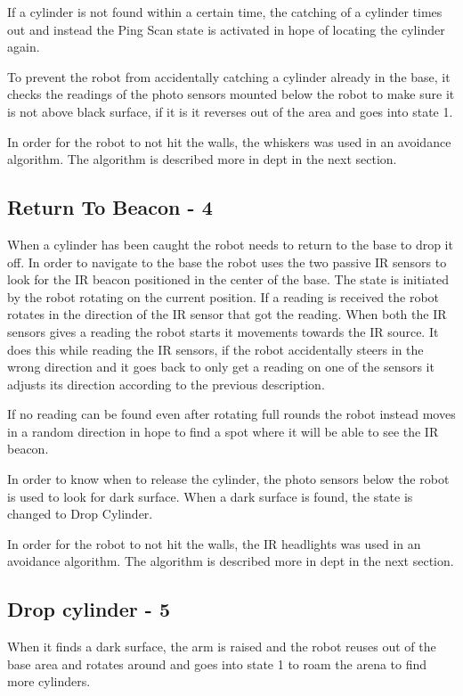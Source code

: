 If a cylinder is not found within a certain time, the catching of a cylinder times out and instead the Ping Scan state is activated in hope of locating the cylinder again.

To prevent the robot from accidentally catching a cylinder already in the base, it checks the readings of the photo sensors mounted below the robot to make sure it is not above black surface, if it is it reverses out of the area and goes into state 1.

In order for the robot to not hit the walls, the whiskers was used in an avoidance algorithm. The algorithm is described more in dept in the next section.

\subsection{Return To Beacon - 4}
When a cylinder has been caught the robot needs to return to the base to drop it off. In order to navigate to the base the robot uses the two passive IR sensors to look for the IR beacon positioned in the center of the base. The state is initiated by the robot rotating on the current position. If a reading is received the robot rotates in the direction of the IR sensor that got the reading. When both the IR sensors gives a reading the robot starts it movements towards the IR source. It does this while reading the IR sensors, if the robot accidentally steers in the wrong direction and it goes back to only get a reading on one of the sensors it adjusts its direction according to the previous description. 

If no reading can be found even after rotating full rounds the robot instead moves in a random direction in hope to find a spot where it will be able to see the IR beacon.

In order to know when to release the cylinder, the photo sensors below the robot is used to look for dark surface. When a dark surface is found, the state is changed to Drop Cylinder.

In order for the robot to not hit the walls, the IR headlights was used in an avoidance algorithm. The algorithm is described more in dept in the next section.


\subsection{Drop cylinder - 5}
 When it finds a dark surface, the arm is raised and the robot reuses out of the base area and rotates around and goes into state 1 to roam the arena to find more cylinders.
 
